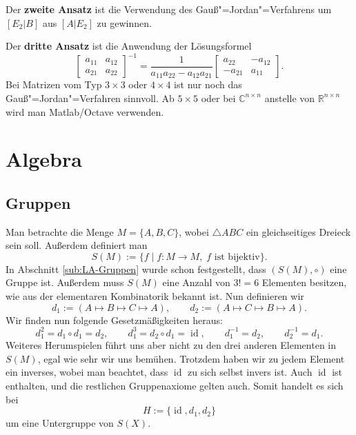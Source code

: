 \documentclass[a4paper,11pt,fleqn,twoside]{scrartcl}
\numberwithin{equation}{section}
\newcommand{\R}{\mathbb R}
\newcommand{\C}{\mathbb C}
\newcommand{\id}{\operatorname{id}}
\newcommand{\strong}[1]{{\sf\bfseries #1}}
\begin{document}
Der \strong{zweite Ansatz}
ist die Verwendung des Gauß"=Jordan"=Verfahrens
um $[E_2|B]$ aus $[A|E_2]$ zu gewinnen.

Der \strong{dritte Ansatz} ist die Anwendung der Lösungsformel
\begin{equation}
\begin{bmatrix}
a_{11} & a_{12}\\
a_{21} & a_{22}
\end{bmatrix}^{-1}
= \frac{1}{a_{11}a_{22}-a_{12}a_{21}}\begin{bmatrix}
a_{22} & -a_{12}\\
-a_{21} & a_{11}
\end{bmatrix}.
\end{equation}
Bei Matrizen vom Typ $3\times 3$ oder $4\times 4$ ist nur noch
das Gauß"=Jordan"=Verfahren sinnvoll. Ab $5\times 5$ oder bei
$\C^{n\times n}$ anstelle von $\R^{n\times n}$ wird man Matlab/Octave
verwenden.

\section{Algebra}
\subsection{Gruppen}
Man betrachte die Menge $M=\{A,B,C\}$, wobei $\triangle ABC$ ein
gleichseitiges Dreieck sein soll. Außerdem definiert man
\begin{equation}
S(M) := \{f\mid f\colon M\to M,\;\text{$f$ ist bijektiv}\}.
\end{equation}
In Abschnitt \ref{sub:LA-Gruppen} wurde schon festgestellt,
dass $(S(M),\circ)$ eine Gruppe ist. Außerdem muss $S(M)$ eine
Anzahl von $3!=6$ Elementen besitzen, wie aus der elementaren
Kombinatorik bekannt ist. Nun definieren wir
\begin{equation}
d_1 := (A \mapsto B \mapsto C\mapsto A),\qquad d_2:=(A\mapsto C\mapsto B\mapsto A).
\end{equation}
Wir finden nun folgende Gesetzmäßigkeiten heraus:
\begin{equation}
d_1^2 = d_1\circ d_1 = d_2, \qquad d_1^3 = d_2\circ d_1 = \id, \qquad d_1^{-1}=d_2,\qquad d_2^{-1}=d_1.
\end{equation}
Weiteres Herumspielen führt uns aber nicht zu den drei anderen
Elementen in $S(M)$, egal wie sehr wir uns bemühen. Trotzdem
haben wir zu jedem Element ein inverses, wobei man beachtet,
dass $\id$ zu sich selbst invers ist. Auch $\id$ ist enthalten,
und die restlichen Gruppenaxiome gelten auch. Somit handelt es sich
bei
\begin{equation}\label{eq:Drehungen}
H := \{\id,d_1,d_2\}
\end{equation}
um eine Untergruppe von $S(X)$.
\end{document}
